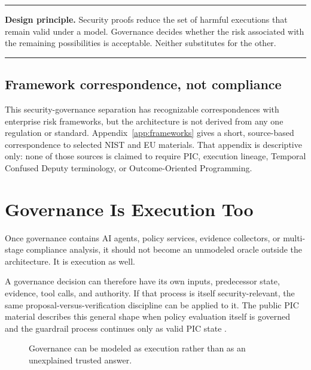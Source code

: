 \documentclass[10pt,oneside,openany]{book}
\newcommand{\principle}[1]{%
  \vspace{4pt}
  \noindent\begin{minipage}{\linewidth}
  \hrule\vspace{5pt}
  \small\sffamily\raggedright\textbf{Design principle.} #1
  \vspace{5pt}\hrule
  \end{minipage}\vspace{4pt}
}
\begin{document}
\principle{Security proofs reduce the set of harmful executions that remain valid under a model. Governance decides whether the risk associated with the remaining possibilities is acceptable. Neither substitutes for the other.}

\section{Framework correspondence, not compliance}

This security-governance separation has recognizable correspondences with enterprise risk frameworks, but the architecture is not derived from any one regulation or standard. Appendix~\ref{app:frameworks} gives a short, source-based correspondence to selected NIST and EU materials. That appendix is descriptive only: none of those sources is claimed to require PIC, execution lineage, Temporal Confused Deputy terminology, or Outcome-Oriented Programming.

\chapter{Governance Is Execution Too}

Once governance contains AI agents, policy services, evidence collectors, or multi-stage compliance analysis, it should not become an unmodeled oracle outside the architecture. It is execution as well.

A governance decision can therefore have its own inputs, predecessor state, evidence, tool calls, and authority. If that process is itself security-relevant, the same proposal-versus-verification discipline can be applied to it. The public PIC material describes this general shape when policy evaluation itself is governed and the guardrail process continues only as valid PIC state \cite{picwhy}.

\begin{figure}[ht]
\centering
{}
\caption{Governance can be modeled as execution rather than as an unexplained trusted answer.}
\end{figure}
\end{document}
